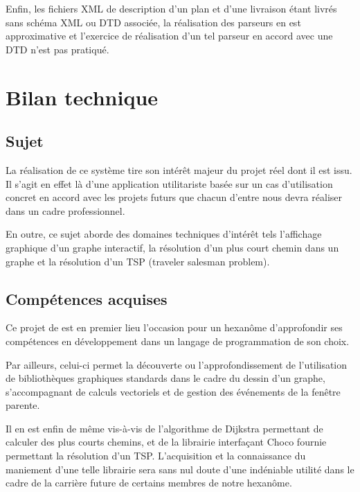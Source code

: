 Enfin, les fichiers XML de description d'un plan et d'une livraison étant livrés sans schéma XML ou DTD associée, la réalisation des parseurs en est approximative et l'exercice de réalisation d'un tel parseur en accord avec une DTD n'est pas pratiqué.
\clearpage

\section{Bilan technique}
\subsection{Sujet}
La réalisation de ce système tire son intérêt majeur du projet réel dont il est issu. Il s’agit en effet là d’une application utilitariste basée sur un cas d’utilisation concret en accord avec les projets futurs que chacun d’entre nous devra réaliser dans un cadre professionnel.

En outre, ce sujet aborde des domaines techniques d'intérêt tels l'affichage graphique d'un graphe interactif, la résolution d'un plus court chemin dans un graphe et la résolution d'un TSP (traveler salesman problem).

\subsection{Compétences acquises}
Ce projet de est en premier lieu l'occasion pour un hexanôme d'approfondir ses compétences en développement dans un langage de programmation de son choix.

Par ailleurs, celui-ci permet la découverte ou l'approfondissement de l'utilisation de bibliothèques graphiques standards dans le cadre du dessin d'un graphe, s'accompagnant de calculs vectoriels et de gestion des événements de la fenêtre parente.

Il en est enfin de même vis-à-vis de l'algorithme de Dijkstra permettant de calculer des plus courts chemins, et de la librairie interfaçant Choco fournie permettant la résolution d'un TSP. L'acquisition et la connaissance du maniement d'une telle librairie sera sans nul doute d'une indéniable utilité dans le cadre de la carrière future de certains membres de notre hexanôme.
\clearpage